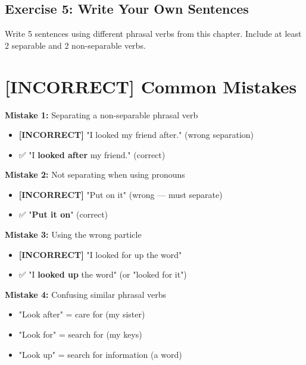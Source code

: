 \subsection{Exercise 5: Write Your Own Sentences}
Write 5 sentences using different phrasal verbs from this chapter. Include at least 2 separable and 2 non-separable verbs.

\begin{tcolorbox}[colback=white,height=6cm]
\end{tcolorbox}

\section{\textbf{[INCORRECT]} Common Mistakes}

\begin{tcolorbox}[colback=red!5, colframe=red!30, title=Phrasal Verb Errors]

\textbf{Mistake 1:} Separating a non-separable phrasal verb
\begin{itemize}
    \item \textbf{[INCORRECT]} "I looked my friend after." (wrong separation)
    \item ✅ "I \textbf{looked after} my friend." (correct)
\end{itemize}

\textbf{Mistake 2:} Not separating when using pronouns
\begin{itemize}
    \item \textbf{[INCORRECT]} "Put on it" (wrong — must separate)
    \item ✅ "\textbf{Put it on}" (correct)
\end{itemize}

\textbf{Mistake 3:} Using the wrong particle
\begin{itemize}
    \item \textbf{[INCORRECT]} "I looked for up the word"
    \item ✅ "I \textbf{looked up} the word" (or "looked for it")
\end{itemize}

\textbf{Mistake 4:} Confusing similar phrasal verbs
\begin{itemize}
    \item "Look after" = care for (my sister)
    \item "Look for" = search for (my keys)
    \item "Look up" = search for information (a word)
\end{itemize}

\end{tcolorbox}

